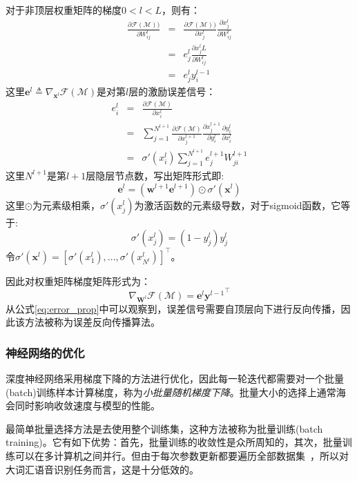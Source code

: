 对于非顶层权重矩阵的梯度$0<l<L$，则有：
\begin{eqnarray}
    \frac{\partial \mathcal{F}(\mathcal{M}))}{\partial W^l_{ij}} &=& \frac{\partial \mathcal{F}(\mathcal{M}))}{\partial x^l_j} \frac{\partial x_j^l}{\partial W^l_{ij}} \\
    &=& e^l_j \frac{\partial x^l_jL}{\partial W^l_{ij}} \\
    &=& e^l_j y^{l-1}_i
\end{eqnarray}
这里$\mathbf{e}^l \triangleq \nabla_{\mathbf{x}^l} \mathcal{F}(\mathcal{M})$是对第$l$层的激励误差信号：
\begin{eqnarray}
    e^l_i &=& \frac{\partial \mathcal{F}(\mathcal{M})}{\partial x^l_i} \\
    &=& \sum_{j=1}^{N^{l+1}} \frac{\partial \mathcal{F}(\mathcal{M})}{\partial x^{l+1}_j} \frac{\partial x^{l+1}_j}{\partial y^l_i} \frac{\partial y^{l}_i}{\partial x^l_i} \\
    &=& \sigma'(x^{l}_i)  \sum_{j=1}^{N^{l+1}} e^{l+1}_j W^{l+1}_{ji}
\end{eqnarray}
这里$N^{l+1}$是第$l+1$层隐层节点数，写出矩阵形式即:
\begin{equation}
    \label{eq:error_prop}
    \mathbf{e}^l = ( {\mathbf{w}^{l+1}} \mathbf{e}^{l+1} ) \odot \sigma'(\mathbf{x}^l)
\end{equation}
这里$\odot$为元素级相乘，$\sigma'(x^l_j)$为激活函数的元素级导数，对于sigmoid函数，它等于:
\begin{equation}
    \sigma'(x^l_j)=(1-y^l_j)y^l_j
\end{equation}
令$\sigma'(\mathbf{x}^l) = [\sigma'(x^l_1), \dots, \sigma'(x^l_{N^l})]^{\top}$。

因此对权重矩阵梯度矩阵形式为：
\begin{equation}
    \nabla_{\mathbf{W}^l} \mathcal{F}(\mathcal{M}) = \mathbf{e}^l {\mathbf{y}^{l-1}}^{\top}
\end{equation}
从公式\ref{eq:error_prop}中可以观察到，误差信号需要自顶层向下进行反向传播，因此该方法被称为误差反向传播算法。

\subsubsection{神经网络的优化}
\label{sec:intro-sgd}
深度神经网络采用梯度下降的方法进行优化，因此每一轮迭代都需要对一个批量(batch)训练样本计算梯度，称为{\em 小批量随机梯度下降}。批量大小的选择上通常海会同时影响收敛速度与模型的性能。

最简单批量选择方法是去使用整个训练集，这种方法被称为批量训练(batch training)。它有如下优势：首先，批量训练的收敛性是众所周知的，其次，批量训练可以在多计算机之间并行。但由于每次参数更新都要遍历全部数据集~\cite{yu2010roles}，所以对大词汇语音识别任务而言，这是十分低效的。

